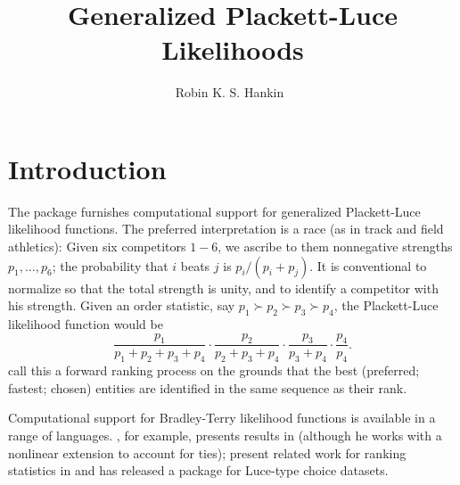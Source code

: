 \documentclass[article]{jss}
\author{Robin K. S. Hankin~\orcidlink{0000-0001-5982-0415}}
\title{Generalized Plackett-Luce Likelihoods}
\begin{document}
\section{Introduction}

The  package \citep{hankin2009,hankin2017} furnishes
computational support for generalized
Plackett-Luce \citep{plackett1975} likelihood functions.  The
preferred interpretation is a race (as in track and field athletics):
Given six competitors $1-6$, we ascribe to them nonnegative strengths
$p_1,\ldots, p_6$; the probability that $i$ beats $j$ is
$p_i/(p_i+p_j)$.  It is conventional to normalize so that the total
strength is unity, and to identify a competitor with his strength.
Given an order statistic, say $p_1\succ p_2\succ p_3\succ p_4$, the
Plackett-Luce likelihood function would be
%
\begin{equation}\label{PL_like}
  \frac{p_1}{p_1+p_2+p_3+p_4}\cdot
  \frac{p_2}{    p_2+p_3+p_4}\cdot
  \frac{p_3}{        p_3+p_4}\cdot
  \frac{p_4}{            p_4}.
\end{equation}
%
\citet{mollica2014} call this a forward ranking process on the grounds
that the best (preferred; fastest; chosen) entities are identified in
the same sequence as their rank.  

Computational support for Bradley-Terry likelihood functions is
available in a range of languages.  \cite{hunter2004}, for example,
presents results in  (although he works with a
nonlinear extension to account for ties); \cite{allison1994} present
related work for ranking statistics in  and
\cite{maystre2022} has released a  package for
Luce-type choice datasets.
\end{document}
